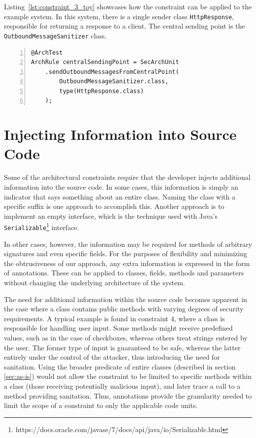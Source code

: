 Listing~\ref{lst:constraint_3_toy} showcases how the constraint can be applied to the example system. In this system, there is a single sender class \texttt{HttpResponse}, responsible for returning a response to a client. The central sending point is the \texttt{OutboundMessageSanitizer} class. 

\begin{minipage}{\linewidth}
\begin{lstlisting}[caption={Application of constraint 3 to the example system.}, captionpos=b, label=lst:constraint_3_toy, numbers=left]
@ArchTest
ArchRule centralSendingPoint = SecArchUnit
    .sendOutboundMessagesFromCentralPoint(
        OutboundMessageSanitizer.class,
        type(HttpResponse.class)
    );
\end{lstlisting}
\end{minipage}




\section{Injecting Information into Source Code}

Some of the architectural constraints require that the developer injects additional information into the source code. In some cases, this information is simply an indicator that says something about an entire class. Naming the class with a specific suffix is one approach to accomplish this. Another approach is to implement an empty interface, which is the technique used with Java's \texttt{Serializable}\footnote{https://docs.oracle.com/javase/7/docs/api/java/io/Serializable.html} interface. 

In other cases, however, the information may be required for methods of arbitrary signatures and even specific fields. For the purposes of flexibility and minimizing the obtrusiveness of our approach, any extra information is expressed in the form of annotations. These can be applied to classes, fields, methods and parameters without changing the underlying architecture of the system.

The need for additional information within the source code becomes apparent in the case where a class contains public methods with varying degrees of security requirements. A typical example is found in constraint 4, where a class is responsible for handling user input. Some methods might receive predefined values, such as in the case of checkboxes, whereas others treat strings entered by the user.  The former type of input is guaranteed to be safe, whereas the latter entirely under the control of the attacker, thus introducing the need for sanitation. Using the broader predicate of entire classes (described in section \ref{sec:as-is}) would not allow the constraint to be limited to specific methods within a class (those receiving potentially malicious input), and later trace a call to a method providing sanitation. Thus, annotations provide the granularity needed to limit the scope of a constraint to only the applicable code units.

